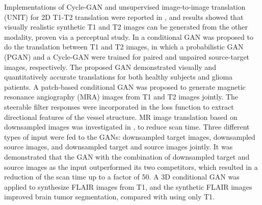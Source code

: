 \documentclass{article}
\begin{document}
Implementations of Cycle-GAN and unsupervised image-to-image translation (UNIT) for 2D T1-T2 translation were reported in \cite{welander2018generative}, and results showed that visually realistic synthetic T1 and T2 images can be generated from the other modality, proven via a perceptual study.
In \cite{dar2018image} a conditional GAN  was proposed to do the translation between T1 and T2 images, in which a probabilistic GAN (PGAN) and a Cycle-GAN were trained for paired and unpaired source-target images, respectively. The proposed GAN demonstrated visually and quantitatively accurate translations for both healthy subjects and glioma patients.
A patch-based conditional GAN \cite{olut2018generative} was proposed to generate magnetic resonance angiography (MRA) images from T1 and T2 images jointly. The steerable filter responses were incorporated in the loss function to extract directional features of the vessel structure.
MR image translation based on downsampled images was investigated in \cite{dar2018synergistic}, to reduce scan time. Three different types of input were fed to the GANs: downsampled target images, downsampled source images, and downsampled target and source images jointly. It was demonstrated that the GAN with the combination of downsampled target and source images as the input outperformed its two competitors, which resulted in a reduction of the scan time up to a factor of 50.
A 3D conditional GAN \cite{yu20183d} was applied to synthesize FLAIR images from T1, and the synthetic FLAIR images  improved brain tumor segmentation, compared with using only T1.


\end{document}
